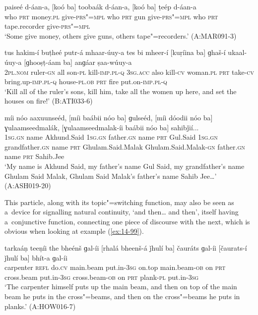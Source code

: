 \begin{exe}
\ex
\label{ex:14-96}
\gll [koó ba] paiseé d-áan-a, [koó ba] toobaák  d-áan-a, [koó ba] ṭeép d-áan-a \\
who \textsc{prt} money.\textsc{pl} give-\textsc{prs"=mpl} who \textsc{prt} gun  give-\textsc{prs"=mpl} who \textsc{prt} tape.recorder give-\textsc{prs"=mpl} \\
\glt `Some give money, others give guns, others tape"=recorders.' (A:MAR091-3)

\ex
\label{ex:14-97}
\gll tus hakim-í buṭheé putr-á mhaar-úuy-a tes  bi  mheer-í [kuṛíina ba]
ɡhaš-í ukaal-úuy-a  [ɡhooṣṭ-áam ba] anɡáar ṣaa-wúuy-a \\
\textsc{2pl.nom} ruler-\textsc{gn} all son-\textsc{pl} kill-\textsc{imp.pl-q} \textsc{3sg.acc} also  kill-\textsc{cv} woman.\textsc{pl} \textsc{prt} take-\textsc{cv} bring.up-\textsc{imp.pl-q}  house-\textsc{pl.ob} \textsc{prt} fire put.on-\textsc{imp.pl-q } \\
\glt `Kill all of the ruler's sons, kill him, take all the women up here, and set the houses on fire!' (B:ATI033-6)

\ex
\label{ex:14-98}
\gll míi nóo aaxuunseéd, [míi baábii nóo ba]  ɡulseéd, [míi
  dóodii nóo ba] ɣulaamseedmalák, [ɣulaamseedmalak-íi baábii nóo ba] sahibǰií... \\
\textsc{1sg.gn} name Akhund.Said \textsc{1sg.gn} father.\textsc{gn} name \textsc{prt}  Gul.Said \textsc{1sg.gn} grandfather.\textsc{gn} name \textsc{prt} Ghulam.Said.Malak Ghulam.Said.Malak-\textsc{gn} father.\textsc{gn} name \textsc{prt} Sahib.Jee  \\
\glt `My name is Akhund Said, my father's name Gul Said, my grandfather's name Ghulam Said Malak, Ghulam Said Malak's father's name Sahib Jee{\ldots}' (A:ASH019-20)
\end{exe}

This particle, along with its topic"=switching function, may also be seen as a~device for signalling natural continuity, `and then{\ldots} and then', itself having a~conjunctive function, connecting one piece of discourse with the next, which is obvious when looking at example (\ref{ex:14-99}).

\begin{exe}
\ex
\label{ex:14-99}
\gll tarkaáṇ teeṇíi the bheénš ɡal-íi  [rhalá bheenš-á ǰhulí ba] čauráts ɡal-íi  [čaurats-í ǰhulí ba] bhít-a ɡal-íi \\
carpenter \textsc{refl} do.\textsc{cv} main.beam put.in-\textsc{3sg }  on.top main.beam-\textsc{ob} on \textsc{prt} cross.beam put.in-\textsc{3sg}  cross.beam-\textsc{ob} on \textsc{prt} plank-\textsc{pl} put.in-\textsc{3sg} \\
\glt `The carpenter himself puts up the main beam, and then on top of the main beam he puts in the cross"=beams, and then on the cross"=beams he puts in planks.' (A:HOW016-7)
\end{exe}

